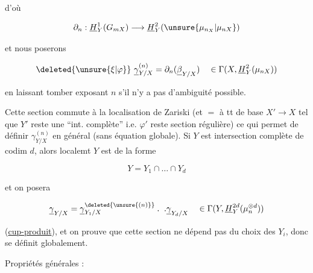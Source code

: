 d'où

\[
\partial_n:\underline H^1_Y(G_{mX})\longrightarrow\underline H^2_Y(\unsure{\mu_{n_X}|\mu_{nX}})
\]

et nous poserons

\[
\deleted{\unsure{\xi|\varphi}}\ \underline\gamma^{(n)}_{Y/X}=\partial_n(\underline\beta_{Y/X})\quad\in\Gamma(X,\underline H^2_Y(\mu_{nX}))
\]

en laissant tomber  exposant $n$ s'il n'y a pas d'ambiguité possible.

 Cette section  commute à la localisation de Zariski (et $=$ à tt  de base $X'\longrightarrow X$ tel que $Y'$ reste une ``int. complète'' i.e. $\varphi'$ reste section régulière) ce qui permet de définir $\gamma^{(n)}_{Y/X}$ en général (sans équation globale). Si  $Y$ est intersection complète de codim $d$, alors localemt $Y$ est de la forme

\[
Y=Y_1\cap\ldots\cap Y_d
\]

et on posera

\[
\underline\gamma_{Y/X}=\underline\gamma^{\deleted{\unsure{(n)}}}_{Y_1/X}\mathbin{.}\ \mathbin{.}\underline\gamma_{Y_d/X}\quad\in\Gamma(Y,\underline H^{2d}_Y(\mu_n^{\otimes d}))
\]

(\uline{cup-produit}), et on prouve que cette section ne dépend pas du choix des $Y_i$, donc se définit globalement.

Propriétés générales :

